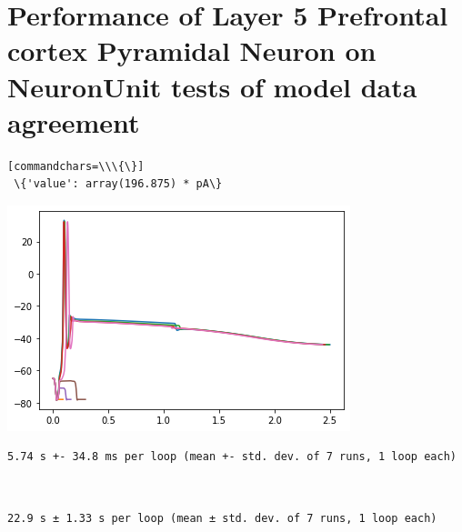     
    

    
\section{Performance of Layer 5 Prefrontal cortex Pyramidal Neuron on
NeuronUnit tests of model data
agreement}
    \begin{verbatim}[commandchars=\\\{\}]
 \{'value': array(196.875) * pA\}
    \end{verbatim}

    \begin{center}
    \includegraphics[width=0.7\linewidth]{figures/NU_BBP_fusion_L5PC_files/NU_BBP_fusion_L5PC_3_1.png}
    \end{center}

    \begin{verbatim}
5.74 s +- 34.8 ms per loop (mean +- std. dev. of 7 runs, 1 loop each)
    \end{verbatim}

    \begin{center}
    \end{center}
    { \hspace*{\fill} \\}
    
    \begin{Verbatim}[commandchars=\\\{\}]
22.9 s ± 1.33 s per loop (mean ± std. dev. of 7 runs, 1 loop each)
    \end{Verbatim}

    \begin{center}
    \end{center}
    { \hspace*{\fill} \\}
    
